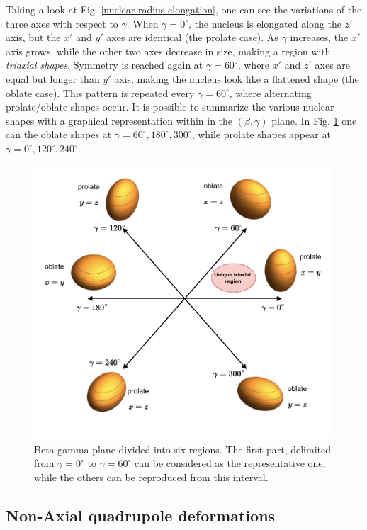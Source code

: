Taking a look at Fig. \ref{nuclear-radius-elongation}, one can see the variations of the three axes with respect to $\gamma$. When $\gamma=0^\circ$, the nucleus is elongated along the $z'$ axis, but the $x'$ and $y'$ axes are identical (the prolate case). As $\gamma$ increases, the $x'$ axis grows, while the other two axes decrease in size, making a region with \emph{triaxial shapes}. Symmetry is reached again at $\gamma=60^\circ$, where $x'$ and $z'$ axes are equal but longer than $y'$ axis, making the nucleus look like a flattened shape (the oblate case). This pattern is repeated every $\gamma=60^\circ$, where alternating prolate/oblate shapes occur. It is possible to summarize the various nuclear shapes with a graphical representation within in the $(\beta,\gamma)$ plane. In Fig. \ref{beta-gamma-plane} one can the oblate shapes at $\gamma=60^\circ,180^\circ,300^\circ$, while prolate shapes appear at $\gamma=0^\circ,120^\circ,240^\circ$.
\begin{figure}
    \centering
    \includegraphics[width=0.99\textwidth]{Chapters/Figures/beta_gamma_plane.pdf}
    \caption{Beta-gamma plane divided into six regions. The first part, delimited from $\gamma=0^\circ$ to $\gamma=60^\circ$ can be considered as the representative one, while the others can be reproduced from this interval.}
    \label{beta-gamma-plane}
\end{figure}

\subsection{Non-Axial quadrupole deformations}

